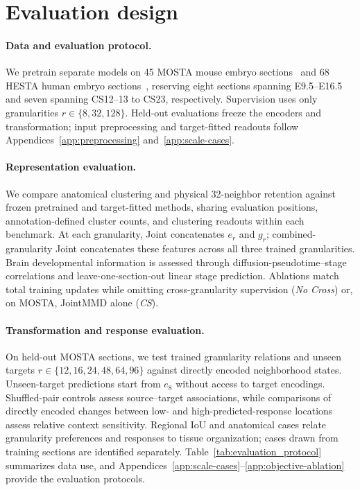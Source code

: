 \section{Evaluation design}
\label{sec:experiments}

\paragraph{Data and evaluation protocol.}
We pretrain separate models on 45 MOSTA mouse embryo sections~\citep{chen2022mosta} and 68 HESTA human embryo sections~\citep{pan2026hesta}, reserving eight sections spanning E9.5--E16.5 and seven spanning CS12--13 to CS23, respectively.
Supervision uses only granularities $r \in \{8,32,128\}$.
Held-out evaluations freeze the encoders and transformation; input preprocessing and target-fitted readouts follow Appendices~\ref{app:preprocessing} and~\ref{app:scale-cases}.

\paragraph{Representation evaluation.}
We compare anatomical clustering and physical 32-neighbor retention against frozen pretrained and target-fitted methods, sharing evaluation positions, annotation-defined cluster counts, and clustering readouts within each benchmark.
At each granularity, Joint concatenates $e_r$ and $g_r$; combined-granularity Joint concatenates these features across all three trained granularities.
Brain developmental information is assessed through diffusion-pseudotime--stage correlations and leave-one-section-out linear stage prediction.
Ablations match total training updates while omitting cross-granularity supervision (\emph{No Cross}) or, on MOSTA, JointMMD alone (\emph{CS}).

\paragraph{Transformation and response evaluation.}
On held-out MOSTA sections, we test trained granularity relations and unseen targets $r \in \{12,16,24,48,64,96\}$ against directly encoded neighborhood states.
Unseen-target predictions start from $e_8$ without access to target encodings.
Shuffled-pair controls assess source--target associations, while comparisons of directly encoded changes between low- and high-predicted-response locations assess relative context sensitivity.
Regional IoU and anatomical cases relate granularity preferences and responses to tissue organization; cases drawn from training sections are identified separately.
Table~\ref{tab:evaluation_protocol} summarizes data use, and Appendices~\ref{app:scale-cases}--\ref{app:objective-ablation} provide the evaluation protocols.
